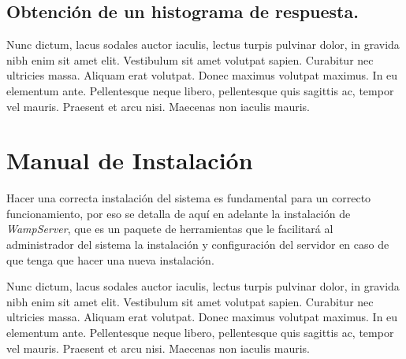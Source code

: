 \subsection{Obtención de un histograma de respuesta.}

Nunc dictum, lacus sodales auctor iaculis, lectus turpis pulvinar dolor, in
gravida nibh enim sit amet elit. Vestibulum sit amet volutpat sapien. Curabitur
nec ultricies massa. Aliquam erat volutpat. Donec maximus volutpat maximus. In
eu elementum ante. Pellentesque neque libero, pellentesque quis sagittis ac,
tempor vel mauris. Praesent et arcu nisi. Maecenas non iaculis mauris.

\section{Manual de Instalación}

Hacer una correcta instalación del sistema es fundamental para un correcto
funcionamiento, por eso se detalla de aquí en adelante la instalación de
\emph{WampServer}, que es un paquete de herramientas que le facilitará al
administrador del sistema la instalación y configuración del servidor en caso
de que tenga que hacer una nueva instalación.

Nunc dictum, lacus sodales auctor iaculis, lectus turpis pulvinar dolor, in
gravida nibh enim sit amet elit. Vestibulum sit amet volutpat sapien. Curabitur
nec ultricies massa. Aliquam erat volutpat. Donec maximus volutpat maximus. In
eu elementum ante. Pellentesque neque libero, pellentesque quis sagittis ac,
tempor vel mauris. Praesent et arcu nisi. Maecenas non iaculis mauris.

